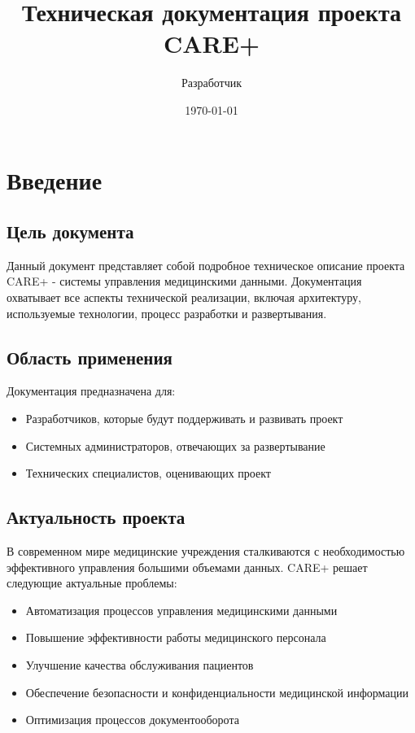 \documentclass[12pt,a4paper]{article}
\title{Техническая документация проекта CARE+}
\author{Разработчик}
\date{\today}
\begin{document}
\maketitle
\tableofcontents
\newpage

\section{Введение}
\subsection{Цель документа}
Данный документ представляет собой подробное техническое описание проекта CARE+ - системы управления медицинскими данными. Документация охватывает все аспекты технической реализации, включая архитектуру, используемые технологии, процесс разработки и развертывания.

\subsection{Область применения}
Документация предназначена для:
\begin{itemize}
    \item Разработчиков, которые будут поддерживать и развивать проект
    \item Системных администраторов, отвечающих за развертывание
    \item Технических специалистов, оценивающих проект
\end{itemize}

\subsection{Актуальность проекта}
В современном мире медицинские учреждения сталкиваются с необходимостью эффективного управления большими объемами данных. CARE+ решает следующие актуальные проблемы:
\begin{itemize}
    \item Автоматизация процессов управления медицинскими данными
    \item Повышение эффективности работы медицинского персонала
    \item Улучшение качества обслуживания пациентов
    \item Обеспечение безопасности и конфиденциальности медицинской информации
    \item Оптимизация процессов документооборота
\end{itemize}
\end{document}
